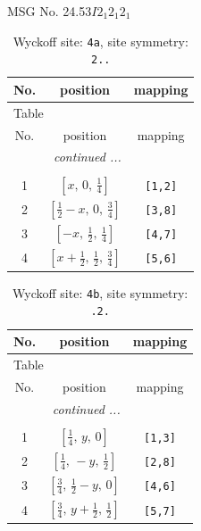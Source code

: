\documentclass[fleqn,8pt]{jsarticle}
\begin{document}
\setcounter{MaxMatrixCols}{32}

\renewcommand{\tablename}{Table~}
\renewcommand{\figurename}{Figure~}
\begin{center}
\LARGE
MSG No. 24.53\quad$I2_{1}2_{1}2_{1}$
\end{center}
\renewcommand{\arraystretch}{1.2}
\begin{longtable}{ccc}
\caption{Wyckoff site: {\tt 4a}, site symmetry: {\tt 2..}}
 \\
 \hline \hline
No. & position & mapping \\ \hline \endfirsthead

\multicolumn{2}{l}{\tablename\ \thetable{}} \\
 \hline \hline
No. & position & mapping \\ \hline \endhead

 \hline \hline
\multicolumn{2}{r}{\footnotesize\it continued ...} \\ \endfoot

 \hline \hline
\multicolumn{2}{r}{} \\ \endlastfoot

1 & $\left[ x,\, 0,\, \frac{1}{4} \right]$ & {\tt [1,2]} \\ \hline
2 & $\left[ \frac{1}{2} - x,\, 0,\, \frac{3}{4} \right]$ & {\tt [3,8]} \\ \hline
3 & $\left[ - x,\, \frac{1}{2},\, \frac{1}{4} \right]$ & {\tt [4,7]} \\ \hline
4 & $\left[ x + \frac{1}{2},\, \frac{1}{2},\, \frac{3}{4} \right]$ & {\tt [5,6]} \\
\end{longtable}
\renewcommand{\arraystretch}{1.2}
\begin{longtable}{ccc}
\caption{Wyckoff site: {\tt 4b}, site symmetry: {\tt .2.}}
 \\
 \hline \hline
No. & position & mapping \\ \hline \endfirsthead

\multicolumn{2}{l}{\tablename\ \thetable{}} \\
 \hline \hline
No. & position & mapping \\ \hline \endhead

 \hline \hline
\multicolumn{2}{r}{\footnotesize\it continued ...} \\ \endfoot

 \hline \hline
\multicolumn{2}{r}{} \\ \endlastfoot

1 & $\left[ \frac{1}{4},\, y,\, 0 \right]$ & {\tt [1,3]} \\ \hline
2 & $\left[ \frac{1}{4},\, - y,\, \frac{1}{2} \right]$ & {\tt [2,8]} \\ \hline
3 & $\left[ \frac{3}{4},\, \frac{1}{2} - y,\, 0 \right]$ & {\tt [4,6]} \\ \hline
4 & $\left[ \frac{3}{4},\, y + \frac{1}{2},\, \frac{1}{2} \right]$ & {\tt [5,7]} \\
\end{longtable}
\end{document}
